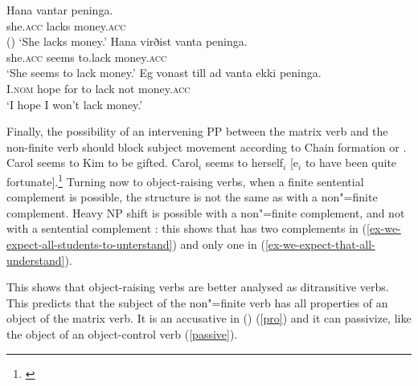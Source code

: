 \eal
\ex 
\gll Hana             vantar peninga.\\
     she.\textsc{acc} lacks  money.\textsc{acc} \\\hfill()
\glt `She lacks money.'
\ex 
\gll Hana             virðist vanta   peninga.\footnotemark \label{need} \\
     she.\textsc{acc} seems   to.lack money.\textsc{acc} \\
\glt `She seems to lack money.'
\ex 
\gll Eg             vonast till ad vanta ekki peninga. \label{hope-i} \\
     I.\textsc{nom} hope   for  to lack  not  money.\textsc{acc} \\
\glt `I hope I won't lack money.'
\zl

Finally, the possibility of an intervening PP between the matrix verb and the non-finite verb should
block subject movement according to Chain formation or 
\citep{Rizzi1986,Rizzi1990b-u}.
\eal
\ex Carol seems to Kim to be gifted.
\ex Carol$_i$ seems to herself$_i$ [e$_i$ to have been quite fortunate].\footnote{
\citet[]{McGinnis2004a-u}
}
\zl
Turning now to object-raising verbs, when a finite sentential complement is possible, the structure
is not the same as  with a non"=finite complement. Heavy NP shift is possible with a non"=finite
complement, and not with a sentential complement \parencites[]{Bresnan1982}[]{PollardandSag1994}: this shows that  has two complements in (\ref{ex-we-expect-all-students-to-unterstand}) and only one in (\ref{ex-we-expect-that-all-understand}).

\eal
{}
\zl



\noindent
This shows that object-raising verbs are better analysed as ditransitive verbs. This predicts that the subject of the non"=finite verb has all properties of an object of the matrix verb. It is an accusative in  () (\ref{pro}) and it can passivize, like the object of an object-control verb (\ref{passive}).

